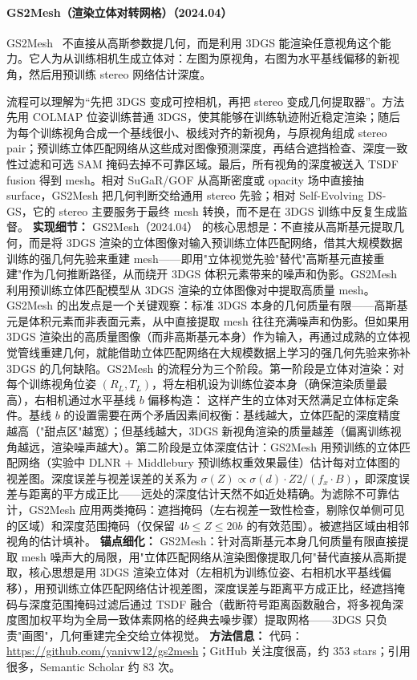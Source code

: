 \paragraph{GS2Mesh（渲染立体对转网格）（2024.04）}
GS2Mesh~\cite{2404_01810} 不直接从高斯参数提几何，而是利用 3DGS 能渲染任意视角这个能力。它人为从训练相机生成立体对：左图为原视角，右图为水平基线偏移的新视角，然后用预训练 stereo 网络估计深度。

流程可以理解为“先把 3DGS 变成可控相机，再把 stereo 变成几何提取器”。方法先用 COLMAP 位姿训练普通 3DGS，使其能够在训练轨迹附近稳定渲染；随后为每个训练视角合成一个基线很小、极线对齐的新视角，与原视角组成 stereo pair；预训练立体匹配网络从这些成对图像预测深度，再结合遮挡检查、深度一致性过滤和可选 SAM 掩码去掉不可靠区域。最后，所有视角的深度被送入 TSDF fusion 得到 mesh。相对 SuGaR/GOF 从高斯密度或 opacity 场中直接抽 surface，GS2Mesh 把几何判断交给通用 stereo 先验；相对 Self-Evolving DS-GS，它的 stereo 主要服务于最终 mesh 转换，而不是在 3DGS 训练中反复生成监督。
\textbf{实现细节：} GS2Mesh（2024.04） 的核心思想是：不直接从高斯基元提取几何，而是将 3DGS 渲染的立体图像对输入预训练立体匹配网络，借其大规模数据训练的强几何先验来重建 mesh——即用"立体视觉先验"替代"高斯基元直接重建"作为几何推断路径，从而绕开 3DGS 体积元素带来的噪声和伪影。GS2Mesh 利用预训练立体匹配模型从 3DGS 渲染的立体图像对中提取高质量 mesh。GS2Mesh 的出发点是一个关键观察：标准 3DGS 本身的几何质量有限——高斯基元是体积元素而非表面元素，从中直接提取 mesh 往往充满噪声和伪影。但如果用 3DGS 渲染出的高质量图像（而非高斯基元本身）作为输入，再通过成熟的立体视觉管线重建几何，就能借助立体匹配网络在大规模数据上学习的强几何先验来弥补 3DGS 的几何缺陷。GS2Mesh 的流程分为三个阶段。第一阶段是立体对渲染：对每个训练视角位姿 $(R_L, T_L)$，将左相机设为训练位姿本身（确保渲染质量最高），右相机通过水平基线 $b$ 偏移构造： 这样产生的立体对天然满足立体标定条件。基线 $b$ 的设置需要在两个矛盾因素间权衡：基线越大，立体匹配的深度精度越高（"甜点区"越宽）；但基线越大，3DGS 新视角渲染的质量越差（偏离训练视角越远，渲染噪声越大）。第二阶段是立体深度估计：GS2Mesh 用预训练的立体匹配网络（实验中 DLNR + Middlebury 预训练权重效果最佳）估计每对立体图的视差图。深度误差与视差误差的关系为 $\sigma(Z) \propto \sigma(d) \cdot Z^{}2 / (f_x \cdot B)$，即深度误差与距离的平方成正比——远处的深度估计天然不如近处精确。为滤除不可靠估计，GS2Mesh 应用两类掩码：遮挡掩码（左右视差一致性检查，剔除仅单侧可见的区域）和深度范围掩码（仅保留 $4b \leq Z \leq 20b$ 的有效范围）。被遮挡区域由相邻视角的估计填补。
\textbf{锚点细化：} GS2Mesh：针对高斯基元本身几何质量有限直接提取 mesh 噪声大的局限，用"立体匹配网络从渲染图像提取几何"替代直接从高斯提取，核心思想是用 3DGS 渲染立体对（左相机为训练位姿、右相机水平基线偏移），用预训练立体匹配网络估计视差图，深度误差与距离平方成正比，经遮挡掩码与深度范围掩码过滤后通过 TSDF 融合（截断符号距离函数融合，将多视角深度图加权平均为全局一致体素网格的经典去噪步骤）提取网格——3DGS 只负责"画图"，几何重建完全交给立体视觉。
\textbf{方法信息：} 代码：\url{https://github.com/yanivw12/gs2mesh}；GitHub 关注度很高，约 353 stars；引用很多，Semantic Scholar 约 83 次。



